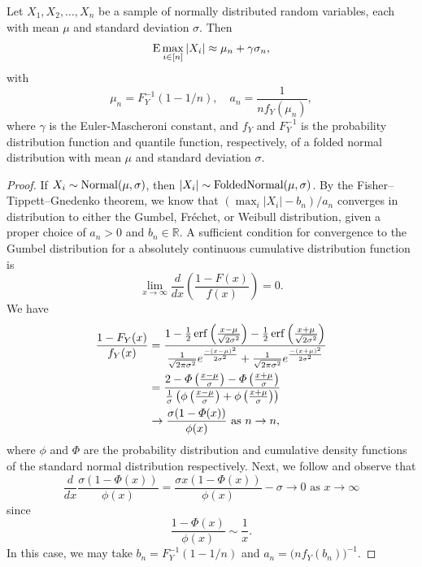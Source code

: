 \begin{theorem}
  Let \(X_1, X_2, \dots, X_n\) be a sample of normally distributed random variables, each with mean \(\mu\) and standard deviation \(\sigma\). Then
  \[
    \operatorname{\text{E}} \max_{i \in [n]} |X_i| \approx \mu_n + \gamma \sigma_n,
  \]
  with
  \[
    \mu_n = F_Y^{-1}(1 - 1/n), \quad a_n = \frac{1}{n f_Y(\mu_n)},
  \]
  where \(\gamma\) is the Euler-Mascheroni constant, and \(f_Y\) and \(F_Y^{-1}\) is the probability distribution function and quantile function, respectively, of a folded normal distribution with mean \(\mu\) and standard deviation \(\sigma\).
\end{theorem}
\begin{proof}
  If \(X_i \sim \operatorname{Normal}(\mu, \sigma)\), then \(|X_i| \sim \operatorname{FoldedNormal}(\mu,\sigma)\). By the Fisher--Tippett--Gnedenko theorem, we know that \((\max_i |X_i| - b_n) / a_n\) converges in distribution to either the Gumbel, Fréchet, or Weibull distribution, given a proper choice of \(a_n > 0\) and \(b_n \in \mathbb{R}\). A sufficient condition for convergence to the Gumbel distribution for a absolutely continuous cumulative distribution function~\parencite[Theorem 10.5.2]{nagaraja2003} is
  \[
    \lim_{x \rightarrow \infty} \frac{d}{dx}\left(\frac{1- F(x)}{f(x)}\right) = 0.
  \]
  We have
  \[
    \begin{aligned}
      \frac{1 - F_Y(x)}{f_Y(x)} & = \frac{1 - \frac{1}{2}\operatorname{erf}{\left(\frac{x - \mu}{\sqrt{2\sigma^2}}\right)} - \frac{1}{2}\operatorname{erf}{\left(\frac{x + \mu}{\sqrt{2\sigma^2}}\right)}}{\frac{1}{\sqrt{2\pi\sigma^2}}e^{\frac{-(x-\mu)^2}{2\sigma^2}} + \frac{1}{\sqrt{2\pi\sigma^2}}e^{\frac{-(x+\mu)^2}{2\sigma^2}}} \\
                                & = \frac{2 - \Phi\left(\frac{x - \mu}{\sigma}\right) - \Phi\left(\frac{x + \mu}{\sigma}\right)}{\frac{1}{\sigma}\left(\phi\left(\frac{x - \mu}{\sigma}\right) + \phi\left(\frac{x + \mu}{\sigma}\right)\right)}                                                              \\
                                & \rightarrow \frac{\sigma(1 - \Phi(x))}{\phi(x)} \text{ as } n \rightarrow n,
    \end{aligned}
  \]
  where \(\phi\) and \(\Phi\) are the probability distribution and cumulative density functions of the standard normal distribution respectively.
  Next, we follow \textcite[example 10.5.3]{nagaraja2003} and observe that
  \[
    \frac{d}{dx} \frac{\sigma(1 - \Phi(x))}{\phi(x)} = \frac{\sigma x (1 - \Phi(x))}{\phi(x)} - \sigma \rightarrow 0 \text{ as } x \rightarrow \infty
  \]
  since
  \[
    \frac{1 - \Phi(x)}{\phi(x)} \sim \frac{1}{x}.
  \]
  In this case, we may take \(b_n = F_Y^{-1}(1 - 1/n)\) and \(a_n = \big(n f_Y(b_n)\big)^{-1}\).
\end{proof}

